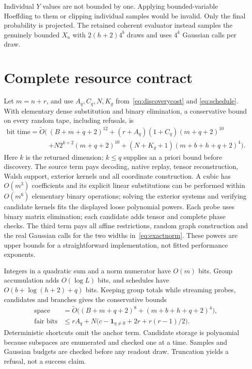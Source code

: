 \documentclass[11pt]{article}
\newcommand{\wtO}{\widetilde O}
\begin{document}
Individual $Y$ values are not bounded by one. Applying bounded-variable Hoeffding to
them or clipping individual samples would be invalid. Only the final probability
is projected. The retained coherent evaluator instead samples the genuinely bounded
$X_a$ with $2(h+2)4^b$ draws and uses $4^k$ Gaussian calls per draw.

\section{Complete resource contract}\label{sec:cost}
Let $m=n+r$, and use $A_q,C_q,N,K_g$ from~\eqref{eq:discoverycost} and
\eqref{eq:schedule}. With elementary dense substitution and binary elimination,
a conservative bound on every random tape, including refusals, is
\begin{equation}\label{eq:time}
\begin{split}
 \text{bit time}=\wtO\big(& (B+m+q+2)^{12}
 +(r+A_q)(1+C_q)(m+q+2)^{10}\\
 &+N2^{k+2}(m+q+2)^{10}
 +(N+K_g+1)(m+b+h+q+2)^4\big).
\end{split}
\end{equation}
Here $k$ is the returned dimension; $k\leq q$ supplies an a priori bound before
discovery. The source term pays decoding, native replay, tensor reconstruction,
Walsh support, exterior kernels and all coordinate construction. A cubic has
$O(m^3)$ coefficients and its explicit linear substitutions can be performed within
$O(m^6)$ elementary binary operations; solving the exterior systems and verifying
candidate kernels fits the displayed loose polynomial powers. Each probe uses
binary matrix elimination; each candidate adds tensor and complete phase checks.
The third term pays all affine restrictions, random graph construction and the
real Gaussian calls for the two widths in~\eqref{eq:exactnorm}. These powers are
upper bounds for a straightforward implementation, not fitted performance exponents.

Integers in a quadratic sum and a norm numerator have $O(m)$ bits. Group accumulation
adds $O(\log L)$ bits, and schedules have $O(b+\log(h+2)+q)$ bits. Keeping group
totals while streaming probes, candidates and branches gives the conservative bounds
\begin{align}
 \text{space}&=\wtO\big((B+m+q+2)^8+(m+b+h+q+2)^4\big),\label{eq:space}\\
 \text{fair bits}&\leq rA_q+N\big(c-\mathbf1_{\eta\ne0}+2r+r(r-1)/2\big).\label{eq:bits}
\end{align}
Deterministic shortcuts omit the anchor term. Candidate storage is polynomial because
subspaces are enumerated and checked one at a time. Samples and Gaussian budgets
are checked before any readout draw. Truncation yields a refusal, not a success claim.
\end{document}
